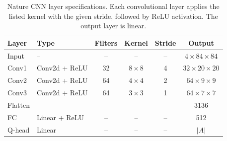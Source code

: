 \begin{table}[ht]
\centering
\renewcommand{\arraystretch}{1.4}
\begin{tabular}{llcccc}
\toprule
Layer & Type & Filters & Kernel & Stride & Output \\
\midrule
Input    & --             & --  & --            & --  & $4 \times 84 \times 84$ \\
Conv1    & Conv2d + ReLU  & 32  & $8 \times 8$  & 4   & $32 \times 20 \times 20$ \\
Conv2    & Conv2d + ReLU  & 64  & $4 \times 4$  & 2   & $64 \times 9 \times 9$ \\
Conv3    & Conv2d + ReLU  & 64  & $3 \times 3$  & 1   & $64 \times 7 \times 7$ \\
Flatten  & --             & --  & --            & --  & 3136 \\
FC       & Linear + ReLU  & --  & --            & --  & 512 \\
Q-head   & Linear         & --  & --            & --  & $|A|$ \\
\bottomrule
\end{tabular}
\caption{Nature CNN layer specifications. Each convolutional layer
  applies the listed kernel with the given stride, followed by ReLU
  activation. The output layer is linear.}
\label{tab:nature-cnn-layers}
\end{table}
